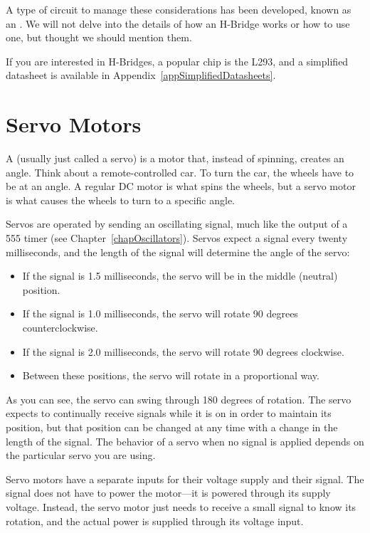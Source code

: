 A type of circuit to manage these considerations has been developed, known as an .
We will not delve into the details of how an H-Bridge works or how to use one, but thought we should mention them.

If you are interested in H-Bridges, a popular chip is the L293, and a simplified datasheet is available in Appendix~\ref{appSimplifiedDatasheets}.

\section{Servo Motors}

A  (usually just called a servo) is a motor that, instead of spinning, creates an angle.
Think about a remote-controlled car.
To turn the car, the wheels have to be at an angle.
A regular DC motor is what spins the wheels, but a servo motor is what causes the wheels to turn to a specific angle.

Servos are operated by sending an oscillating signal, much like the output of a 555 timer (see Chapter~\ref{chapOscillators}).
Servos expect a signal every twenty milliseconds, and the length of the signal will determine the angle of the servo:

\begin{itemize}
\item If the signal is 1.5 milliseconds, the servo will be in the middle (neutral) position.
\item If the signal is 1.0 milliseconds, the servo will rotate 90 degrees counterclockwise.
\item If the signal is 2.0 milliseconds, the servo will rotate 90 degrees clockwise.
\item Between these positions, the servo will rotate in a proportional way.
\end{itemize}

As you can see, the servo can swing through 180 degrees of rotation.
The servo expects to continually receive signals while it is on in order to maintain its position, but that position can be changed at any time with a change in the length of the signal.
The behavior of a servo when no signal is applied depends on the particular servo you are using.

Servo motors have a separate inputs for their voltage supply and their signal.
The signal does not have to power the motor---it is powered through its supply voltage.
Instead, the servo motor just needs to receive a small signal to know its rotation, and the actual power is supplied through its voltage input.

